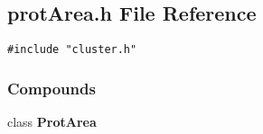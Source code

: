 \subsection{prot\-Area.h File Reference}
\label{protArea.h}
{\tt \#include "cluster.h"}\par
\subsubsection*{Compounds}
\begin{CompactItemize}
\item 
class {\bf Prot\-Area}
\end{CompactItemize}
